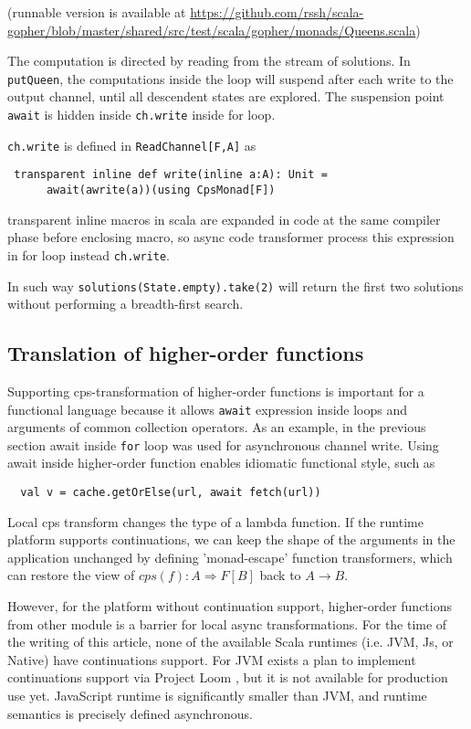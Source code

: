\documentclass{llncs}
\begin{document}
(runnable version is available at \url{https://github.com/rssh/scala-gopher/blob/master/shared/src/test/scala/gopher/monads/Queens.scala})

The computation is directed by reading from the stream of solutions.  
In \lstinline|putQueen|, the computations inside the loop will suspend after each write to the output channel, until all descendent states are explored.
 The suspension point \lstinline|await| is hidden inside \lstinline|ch.write| inside for loop.

\lstinline|ch.write| is defined in \lstinline|ReadChannel[F,A]| as
\begin{lstlisting}
 transparent inline def write(inline a:A): Unit = 
      await(awrite(a))(using CpsMonad[F])
\end{lstlisting}
 transparent inline macros in scala are expanded in code at the same compiler phase before enclosing macro, so async code transformer process this expression in for loop instead \lstinline|ch.write|.
 
In such way
 \lstinline|solutions(State.empty).take(2)|  will return the first two solutions without performing a breadth-first search. 

\subsection{ Translation of higher-order functions }

\label{HO}

Supporting cps-transformation of higher-order functions is important for a functional language because it allows \lstinline|await| expression inside loops and arguments of common collection operators.
  As an example, in the previous section await inside \lstinline|for| loop was used for asynchronous channel write. Using await inside higher-order function enables idiomatic functional style, such as
\begin{lstlisting}
  val v = cache.getOrElse(url, await fetch(url)) 
\end{lstlisting}
  
   Local cps transform changes the type of a lambda function.  If the runtime platform supports continuations, we can  keep the shape of the arguments in the application unchanged by defining 'monad-escape' function transformers, which can restore the view of $cps(f):A \Rightarrow F[B]$ back to $A \rightarrow B$.  

However, for the platform without continuation support, higher-order functions from other module is a barrier for local async transformations.   For the time of the writing of this article, none of the available Scala runtimes (i.e. JVM, Js, or Native) have continuations support.  For JVM exists a plan to implement continuations support via Project Loom \cite{ProjectLoom},  but it is not available for production use yet.  JavaScript runtime is significantly smaller than JVM, and runtime semantics is precisely defined asynchronous.  
\end{document}
